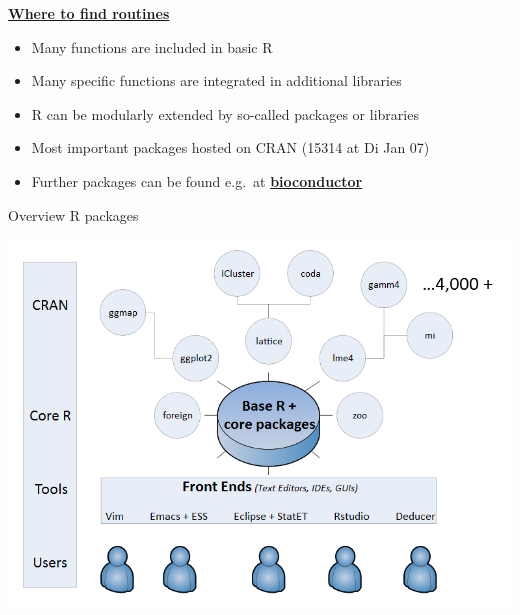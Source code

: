 \documentclass[
  10pt,
  ignorenonframetext,
]{beamer}
\providecommand{\tightlist}{%
  \setlength{\itemsep}{0pt}\setlength{\parskip}{0pt}}
\begin{document}
\begin{frame}{\href{https://stats.idre.ucla.edu/r/seminars/intro/}{\textbf{Where
to find routines}}}
\protect\hypertarget{where-to-find-routines}{}

\begin{itemize}
\tightlist
\item
  Many functions are included in basic R
\item
  Many specific functions are integrated in additional libraries
\item
  R can be modularly extended by so-called packages or libraries
\item
  Most important packages hosted on CRAN (15314 at Di Jan 07)
\item
  Further packages can be found e.g.~at
  \href{www.bioconductor.org}{\textbf{bioconductor}}
\end{itemize}

\begin{block}{Overview R packages}

\includegraphics[width=\textwidth,height=0.6\textheight]{figure/Packages.PNG}

\end{block}

\end{frame}
\end{document}
